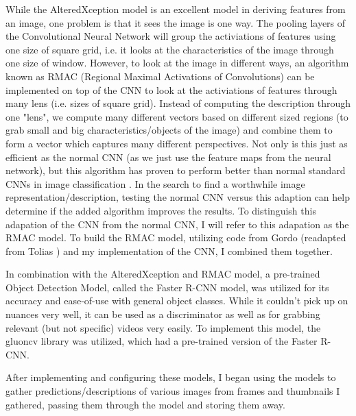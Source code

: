\documentclass[10pt,twocolumn]{article}
\begin{document}
While the AlteredXception model is an excellent model in deriving features from an image, one problem is that it sees the image is one way. The pooling layers of the Convolutional Neural Network will group the activiations of features using one size of square grid, i.e. it looks at the characteristics of the image through one size of window. However, to look at the image in different ways, an algorithm known as RMAC (Regional Maximal Activations of Convolutions) can be implemented on top of the CNN to look at the activiations of features through many lens (i.e. sizes of square grid). Instead of computing the description through one "lens", we compute many different vectors based on different sized regions (to grab small and big characteristics/objects of the image) and combine them to form a vector which captures many different perspectives. Not only is this just as efficient as the normal CNN (as we just use the feature maps from the neural network), but this algorithm has proven to perform better than normal standard CNNs in image classification \cite{Tolias2016 TODO}.
In the search to find a worthwhile image representation/description, testing the normal CNN versus this adaption can help determine if the added algorithm improves the results. To distinguish this adapation of the CNN from the normal CNN, I will refer to this adapation as the RMAC model. To build the RMAC model, utilizing code from Gordo \cite{Gordo2016 TODO} (readapted from Tolias \cite{Tolias2016 TODO}) and my implementation of the CNN, I combined them together.

In combination with the AlteredXception and RMAC model, a pre-trained Object Detection Model, called the Faster R-CNN model, was utilized for its accuracy and ease-of-use with general object classes. While it couldn't pick up on nuances very well, it can be used as a discriminator as well as for grabbing relevant (but not specific) videos very easily. To implement this model, the gluoncv library was utilized, which had a pre-trained version of the Faster R-CNN.

After implementing and configuring these models, I began using the models to gather predictions/descriptions of various images from frames and thumbnails I gathered, passing them through the model and storing them away.
\end{document}
